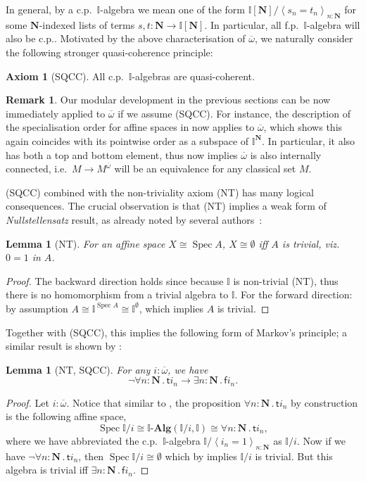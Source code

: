 \documentclass[12pt]{amsart}
\newtheorem{lemma}[theorem]{Lemma}
\theoremstyle{definition}
\newtheorem{remark}[theorem]{Remark}
\newtheorem*{axiom}{Axiom}
\newcommand{\mb}[1]{\mathbf{#1}}
\newcommand{\mbb}[1]{\mathbb{#1}}
\newcommand{\I}{\mbb I}
\newcommand{\ms}[1]{\mathsf{#1}}
\newcommand{\alg}{\text{-}\mb{Alg}}
\newcommand{\ov}[1]{\overline{#1}}
\newcommand{\pair}[1]{\left\langle#1\right\rangle}
\newcommand{\N}{\mb N}
\newcommand{\fa}[2]{\forall #1\!\colon\!\!#2\mathpunct{.}}
\newcommand{\ex}[2]{\exists #1\!\colon\!\!#2\mathpunct{.}}
\newcommand{\emp}{\emptyset}
\newcommand{\spec}{\operatorname{Spec}}
\begin{document}
In general, by a c.p.\ $\I$-algebra we mean one of the form $\I[\N]/\pair{s_n = t_n}_{n:\N}$ for some $\N$-indexed lists of terms $s,t : \N \to \I[\N]$. In particular, all f.p.\ $\I$-algebra will also be c.p.. Motivated by the above characterisation of $\ov\omega$, we naturally consider the following stronger quasi-coherence principle:

\begin{axiom}[SQCC]
  All c.p.\ $\I$-algebras are quasi-coherent.
\end{axiom}

\begin{remark}
  Our modular development in the previous sections can be now immediately applied to $\ov\omega$ if we assume (SQCC). For instance, the description of the specialisation order for affine spaces in  now applies to $\ov\omega$, which shows this again coincides with its pointwise order as a subspace of $\I^\N$. In particular, it also has both a top and bottom element, thus  now implies $\ov\omega$ is also internally connected, i.e.\ $M \to M^{\ov\omega}$ will be an equivalence for any classical set $M$. 
\end{remark}

(SQCC) combined with the non-triviality axiom (NT) has many logical consequences. The crucial observation is that (NT) implies a weak form of \emph{Nullstellensatz} result, as already noted by several authors~\cite{blechschmidt2021using,blechschmidt2020general,Cherubini_Coquand_Hutzler_2024}:

\begin{lemma}[NT]\label{lem:nulls}
  For an affine space $X \cong \spec A$, $X \cong \emp$ iff $A$ is trivial, viz.\ $0=1$ in $A$.
\end{lemma}
\begin{proof}
  The backward direction holds since because $\I$ is non-trivial (NT), thus there is no homomorphism from a trivial algebra to $\I$. For the forward direction: by assumption $A \cong \I^{\spec A} \cong \I^\emp$, which implies $A$ is trivial. 
\end{proof}

Together with (SQCC), this implies the following form of Markov's principle; a similar result is shown by \citet{cherubini2024foundation}:

\begin{lemma}[NT, SQCC]\label{lem:markov}
  For any $i : \ov\omega$, we have
  \[ \neg\fa{n}{\N}\ms ti_n \to \ex n\N\ms fi_n. \]
\end{lemma}
\begin{proof}
  Let $i : \ov\omega$. Notice that similar to , the proposition $\fa n\N \ms ti_n$ by construction is the following affine space, 
  \[ \spec\I/i \cong \I\alg(\I/i,\I) \cong \fa n\N \ms ti_n, \]
  where we have abbreviated the c.p.\ $\I$-algebra $\I/\pair{i_n=1}_{n:\N}$ as $\I/i$. Now if we have $\neg\fa n\N \ms ti_n$, then $\spec\I/i \cong \emp$ which by  implies $\I/i$ is trivial. But this algebra is trivial iff $\ex n\N \ms fi_n$.
\end{proof}
\end{document}
